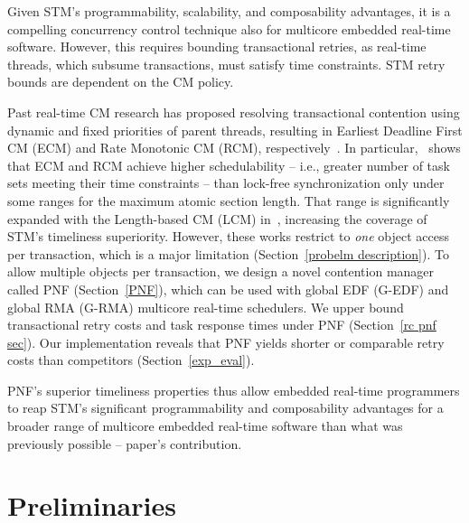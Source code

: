 \documentclass[twocolumn]{article}
\begin{document}
Given STM's programmability, scalability, and composability advantages, it is a compelling concurrency control technique also for multicore embedded real-time software. However, this requires  bounding transactional  retries, as real-time threads, which subsume transactions, must satisfy time constraints.  STM retry bounds are dependent on the CM policy.

Past real-time CM research has proposed resolving transactional contention using dynamic and fixed priorities of parent threads, resulting in Earliest Deadline First CM (ECM) and Rate Monotonic CM (RCM), respectively~\cite{6045438,stmconcurrencycontrol:emsoft11,lcmdac2012}.
In particular,~\cite{stmconcurrencycontrol:emsoft11} shows that ECM and RCM achieve higher schedulability -- i.e., greater number of task sets meeting their time constraints -- than lock-free synchronization only under some ranges for the maximum atomic section length. That range is significantly expanded with the Length-based CM (LCM) in~\cite{lcmdac2012}, increasing the coverage of STM's timeliness superiority. However, these works restrict to \textit{one} object access per transaction, which is a major limitation (Section~\ref{probelm description}). To allow multiple objects per transaction, we design a novel contention manager called PNF  (Section~\ref{PNF}), which can be used with global EDF (G-EDF) and global RMA (G-RMA) multicore real-time schedulers. 
We upper bound transactional retry costs and task response times under PNF (Section~\ref{rc pnf sec}).
 Our implementation reveals that PNF yields shorter or comparable retry costs than competitors (Section~\ref{exp_eval}).

PNF's superior timeliness properties thus allow embedded real-time programmers to reap STM's significant programmability and composability advantages for a broader range of multicore embedded real-time software than what was previously possible -- paper's contribution. 

\section{Preliminaries}
\label{sec:model}
\end{document}
